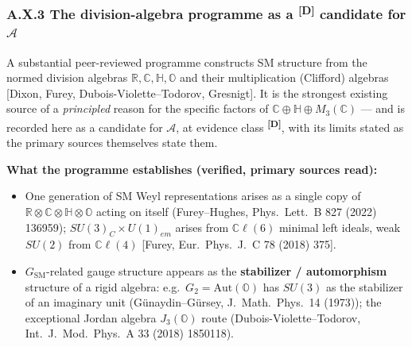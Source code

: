 \documentclass[12pt,a4paper,twoside]{article}
\theoremstyle{plain}
\theoremstyle{definition}
\theoremstyle{remark}
\newcommand{\catmark}[1]{\textsuperscript{\textsf{\textbf{[#1]}}}}
\begin{document}
\subsubsection*{A.X.3 The division-algebra programme as a \catmark{D} candidate for $\mathcal{A}$}

A substantial peer-reviewed programme constructs SM structure from the normed division algebras $\mathbb{R},\mathbb{C},\mathbb{H},\mathbb{O}$ and their multiplication (Clifford) algebras [Dixon, Furey, Dubois-Violette--Todorov, Gresnigt]. It is the strongest existing source of a \emph{principled} reason for the specific factors of $\mathbb{C}\oplus\mathbb{H}\oplus M_3(\mathbb{C})$ — and is recorded here as a candidate for $\mathcal{A}$, at evidence class \textbf{\catmark{D}}, with its limits stated as the primary sources themselves state them.

\textbf{What the programme establishes (verified, primary sources read):}
\begin{itemize}
\item One generation of SM Weyl representations arises as a single copy of $\mathbb{R}\otimes\mathbb{C}\otimes\mathbb{H}\otimes\mathbb{O}$ acting on itself (Furey--Hughes, Phys.\ Lett.\ B 827 (2022) 136959); $SU(3)_C\times U(1)_{em}$ arises from $\mathbb{C}\ell(6)$ minimal left ideals, weak $SU(2)$ from $\mathbb{C}\ell(4)$ [Furey, Eur.\ Phys.\ J.\ C 78 (2018) 375].
\item $G_{\mathrm{SM}}$-related gauge structure appears as the \textbf{stabilizer / automorphism} structure of a rigid algebra: e.g.\ $G_2=\mathrm{Aut}(\mathbb{O})$ has $SU(3)$ as the stabilizer of an imaginary unit (G\"unaydin--G\"ursey, J.\ Math.\ Phys.\ 14 (1973)); the exceptional Jordan algebra $J_3(\mathbb{O})$ route (Dubois-Violette--Todorov, Int.\ J.\ Mod.\ Phys.\ A 33 (2018) 1850118).
\end{itemize}
\end{document}
